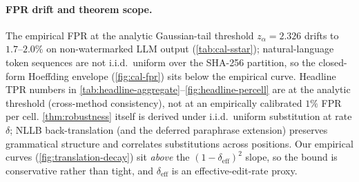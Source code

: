 \paragraph{FPR drift and theorem scope.} The empirical FPR at the
analytic Gaussian-tail threshold $z_\alpha=2.326$ drifts to
$1.7$--$2.0\%$ on non-watermarked LLM output
(\autoref{tab:cal-sstar}); natural-language token sequences are not
i.i.d.\ uniform over the SHA-256 partition, so the closed-form
Hoeffding envelope (\autoref{fig:cal-fpr}) sits below the empirical
curve. Headline TPR numbers in
\autoref{tab:headline-aggregate}--\autoref{fig:headline-percell}
are at the analytic threshold (cross-method consistency), not at
an empirically calibrated $1\%$ FPR per cell. \autoref{thm:robustness}
itself is derived under i.i.d.\ uniform substitution at rate
$\delta$; NLLB back-translation (and the deferred paraphrase
extension) preserves grammatical structure and correlates
substitutions across positions. Our empirical curves
(\autoref{fig:translation-decay}) sit \emph{above} the
$(1-\delta_{\mathrm{eff}})^2$ slope, so the bound is conservative
rather than tight, and $\delta_{\mathrm{eff}}$ is an
effective-edit-rate proxy.

